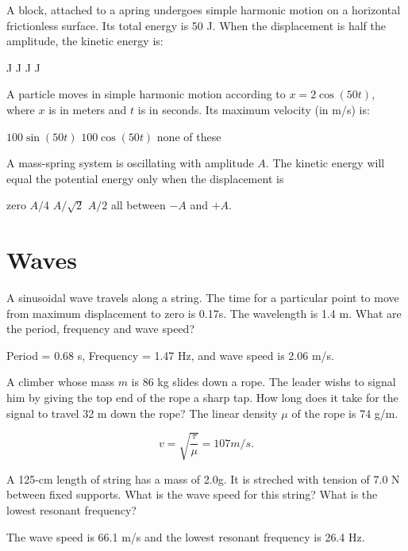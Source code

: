 \begin{questions}
\question[2] A block, attached to a apring undergoes simple harmonic
motion on a horizontal frictionless surface. Its total energy is 50
J. When the displacement is half the amplitude, the kinetic energy is:
\begin{oneparchoices}
   J
   J
   J
   J
\end{oneparchoices}

\question[2] A particle moves in simple harmonic motion according to
$x = 2\cos(50 t)$, where $x$ is in meters and $t$ is in seconds. Its
maximum velocity  (in m/s) is:
\begin{oneparchoices}
  \choice $100 \sin (50 t)$
  \choice $100 \cos (50 t)$
  \choice none of these
\end{oneparchoices}

\question[2] A mass-spring system is oscillating with amplitude
$A$. The kinetic energy will equal the potential energy only when the
displacement is
\begin{oneparchoices}
  \choice zero
  \choice $A/4$
  \CorrectChoice $A/\sqrt{2}$
  \choice $A/2$
  \choice all between $-A$ and $+A$.
\end{oneparchoices}

\section{Waves}

\question[2] A sinusoidal wave travels along a string. The time for a
particular point to move from maximum displacement to zero is
0.17s. The wavelength is 1.4 m. What are the period, frequency and wave speed?
\begin{solution}
  Period = 0.68 s, Frequency = 1.47 Hz, and wave speed is 2.06 m/s.
\end{solution}

\question[2] A climber whose mass $m$ is 86 kg slides down a rope. The
leader wishs to signal him by giving the top end of the rope a sharp
tap. How long does it take for the signal to travel 32 m down the
rope? The linear density $\mu$ of the rope is 74 g/m.
\begin{solution}
  $$v = \sqrt{\frac{\tau}{\mu}} = 107 m/s.$$
\end{solution}

\question[2] A 125-cm length of string has a mass of 2.0g. It is
streched with tension of 7.0 N between fixed supports. What is the
wave speed for this string? What is the lowest resonant frequency?
\begin{solution}
  The wave speed is 66.1 m/s and the lowest resonant frequency is 26.4 Hz.
\end{solution}




\end{questions}


